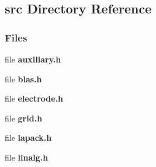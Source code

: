 \subsection{src Directory Reference}
\label{dir_68267d1309a1af8e8297ef4c3efbcdba}
\subsubsection*{Files}
\begin{DoxyCompactItemize}
\item 
file \textbf{ auxiliary.\+h}
\item 
file \textbf{ blas.\+h}
\item 
file \textbf{ electrode.\+h}
\item 
file \textbf{ grid.\+h}
\item 
file \textbf{ lapack.\+h}
\item 
file \textbf{ linalg.\+h}
\end{DoxyCompactItemize}
